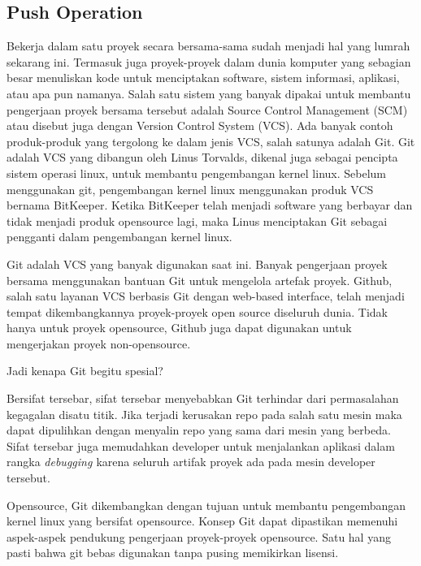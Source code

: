 \subsection {Push Operation}
Bekerja dalam satu proyek secara bersama-sama sudah menjadi hal yang lumrah sekarang ini. Termasuk juga proyek-proyek dalam dunia komputer yang sebagian besar menuliskan kode untuk menciptakan software, sistem informasi, aplikasi, atau apa pun namanya. Salah satu sistem yang banyak dipakai untuk membantu pengerjaan proyek bersama tersebut adalah Source Control Management (SCM) atau disebut juga dengan Version Control System (VCS). Ada banyak contoh produk-produk yang tergolong ke dalam jenis VCS, salah satunya adalah Git. Git adalah VCS yang dibangun oleh Linus Torvalds, dikenal juga sebagai pencipta sistem operasi linux, untuk membantu pengembangan kernel linux. Sebelum menggunakan git, pengembangan kernel linux menggunakan produk VCS bernama BitKeeper. Ketika BitKeeper telah menjadi software yang berbayar dan tidak menjadi produk opensource lagi, maka Linus menciptakan Git sebagai pengganti dalam pengembangan kernel linux. \par
Git adalah VCS yang banyak digunakan saat ini. Banyak pengerjaan proyek bersama menggunakan bantuan Git untuk mengelola artefak proyek. Github, salah satu layanan VCS berbasis Git dengan web-based interface, telah menjadi tempat dikembangkannya proyek-proyek open source diseluruh dunia. Tidak hanya untuk proyek opensource, Github juga dapat digunakan untuk mengerjakan proyek non-opensource. \par
\noindent 
Jadi kenapa Git begitu spesial? \par
\noindent 
Bersifat tersebar, sifat tersebar menyebabkan Git terhindar dari permasalahan kegagalan disatu titik. Jika terjadi kerusakan repo pada salah satu mesin maka dapat dipulihkan dengan menyalin repo yang sama dari mesin yang berbeda. Sifat tersebar juga memudahkan developer untuk menjalankan aplikasi dalam rangka \textit{debugging $  $}karena seluruh artifak proyek ada pada mesin developer tersebut. \par
\noindent 
Opensource, Git dikembangkan dengan tujuan untuk membantu pengembangan kernel linux yang bersifat opensource. Konsep Git dapat dipastikan memenuhi aspek-aspek pendukung pengerjaan proyek-proyek opensource. Satu hal yang pasti bahwa git bebas digunakan tanpa pusing memikirkan lisensi. \par
\noindent 
